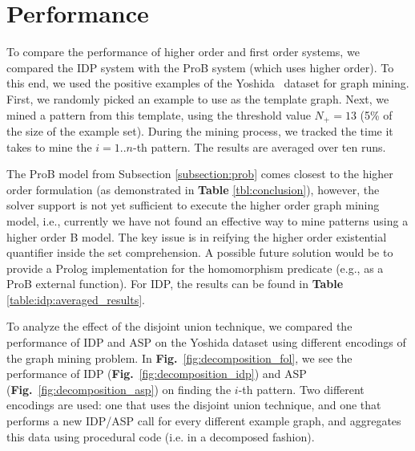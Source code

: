 \section{Performance}\label{sec:performance}
To compare the performance of higher order and first order systems, we compared the IDP system with the ProB system (which uses higher order).
To this end, we used the positive examples of the Yoshida~\citep{yoshida_dataset} dataset for graph mining.
First, we randomly picked an example to use as the template graph.
Next, we mined a pattern from this template, using the threshold value $N_{+} = 13$ (5\% of the size of the example set).
During the mining process, we tracked the time it takes to mine the $i=1..n$-th pattern. The results are averaged over ten runs.


The ProB model from Subsection \ref{subsection:prob} comes closest to the higher order formulation (as demonstrated in \textbf{Table} \ref{tbl:conclusion}), however, the solver support is not yet sufficient to execute the higher order graph mining model, i.e., currently we have not found an effective way to mine patterns using a higher order B model. The key issue is in reifying the higher order existential quantifier inside the set comprehension. A possible future solution would be to provide a Prolog implementation for the homomorphism predicate (e.g., as a ProB external function). For IDP, the results can be found in \textbf{Table} \ref{table:idp:averaged_results}.

To analyze the effect of the disjoint union technique, we compared the performance of IDP and ASP on the Yoshida dataset using different encodings of the graph mining problem.
In \textbf{Fig.}~\ref{fig:decomposition_fol}, we see the performance of IDP (\textbf{Fig.}~\ref{fig:decomposition_idp}) and ASP (\textbf{Fig.}~\ref{fig:decomposition_asp}) on finding the $i$-th pattern.
Two different encodings are used: one that uses the disjoint union technique, and one that performs a new IDP/ASP call for every different example graph, and aggregates this data using procedural code (i.e. in a decomposed fashion).

